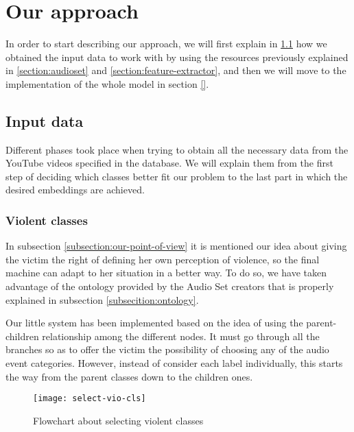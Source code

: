 \section{Our approach}
\label{section:our-approach}

	In order to start describing our approach, we will first explain in \ref{subsection:input-data} how we obtained the input data to work with by using the resources previously explained in \ref{section:audioset} and \ref{section:feature-extractor}, and then we will move to the implementation of the whole model in section \ref{}.
	
\subsection{Input data}
\label{subsection:input-data}

	Different phases took place when trying to obtain all the necessary data from the YouTube videos specified in the database. We will explain them from the first step of deciding which classes better fit our problem to the last part in which the desired embeddings are achieved.
	
\subsubsection{Violent classes}
\label{subsection:violent-classes}

	In subsection \ref{subsection:our-point-of-view} it is mentioned our idea about giving the victim the right of defining her own perception of violence, so the final machine can adapt to her situation in a better way. To do so, we have taken advantage of the ontology provided by the Audio Set creators that is properly explained in subsection \ref{subsecition:ontology}. 
	
	Our little system has been implemented based on the idea of using the parent-children relationship among the different nodes. It must go through all the branches so as to offer the victim the possibility of choosing any of the audio event categories. However, instead of consider each label individually, this starts the way from the parent classes down to the children ones.
	
	\begin{wrapfigure}{R}{0.4\textwidth}
		\centering
		\captionsetup{justification=centering}
		\texttt{[image: select-vio-cls]}
		\caption{Flowchart about selecting violent classes}
		\label{fig:mesh3}
	\end{wrapfigure}
	
